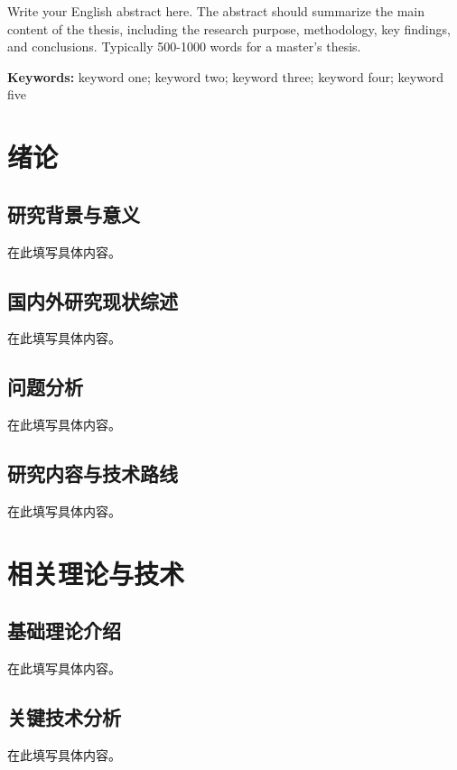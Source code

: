 \documentclass[a4paper,12pt,openright]{ctexrep}
\begin{document}
Write your English abstract here. The abstract should summarize the main content of the thesis, including the research purpose, methodology, key findings, and conclusions. Typically 500-1000 words for a master's thesis.

\vspace{1cm}
\noindent\textbf{Keywords:} keyword one; keyword two; keyword three; keyword four; keyword five

\newpage
\tableofcontents


\newpage


\chapter{绪论}
\section{研究背景与意义}
在此填写具体内容。

\section{国内外研究现状综述}
在此填写具体内容。

\section{问题分析}
在此填写具体内容。

\section{研究内容与技术路线}
在此填写具体内容。


\chapter{相关理论与技术}
\section{基础理论介绍}
在此填写具体内容。

\section{关键技术分析}
在此填写具体内容。
\end{document}
